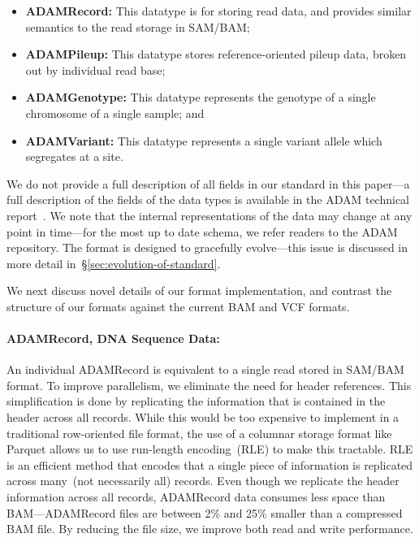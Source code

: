 \documentclass{bioinfo}
\begin{document}
\begin{itemize}
\item \textbf{ADAMRecord:} This datatype is for storing read data, and provides similar semantics to the read storage in SAM/BAM;
\item \textbf{ADAMPileup:} This datatype stores reference-oriented pileup data, broken out by individual read base;
\item \textbf{ADAMGenotype:} This datatype represents the genotype of a single chromosome of a single sample; and
\item \textbf{ADAMVariant:} This datatype represents a single variant allele which segregates at a site.
\end{itemize}

We do not provide a full description of all fields in our standard in this paper---a full description of the fields of the data types is available in the ADAM technical
report~\citep[see][\S5]{massie13}. We note that the internal representations of the data may change at any point in time---for the most up to date schema, we refer readers
to the ADAM repository. The format is designed to gracefully evolve---this issue is discussed in more detail in~\S\ref{sec:evolution-of-standard}.

We next discuss novel details of our format implementation, and contrast the structure of our formats against the current BAM and VCF formats. 

\paragraph{ADAMRecord, DNA Sequence Data:}
\label{sec:adamrecord}

An individual ADAMRecord is equivalent to a single read stored in SAM/BAM format. To improve parallelism, we eliminate the need for header references. This simplification
is done by replicating the information that is contained in the header across all records. While this would be too expensive to implement in a traditional row-oriented file format,
the use of a columnar storage format like Parquet allows us to use run-length encoding~(RLE) to make this tractable. RLE is an efficient method that encodes that a single piece
of information is replicated across many~(not necessarily all) records. Even though we replicate the header information across all records, ADAMRecord data consumes less
space than BAM---ADAMRecord files are between 2\% and 25\% smaller than a compressed BAM file. By reducing the file size, we improve both read and write performance.
\end{document}
